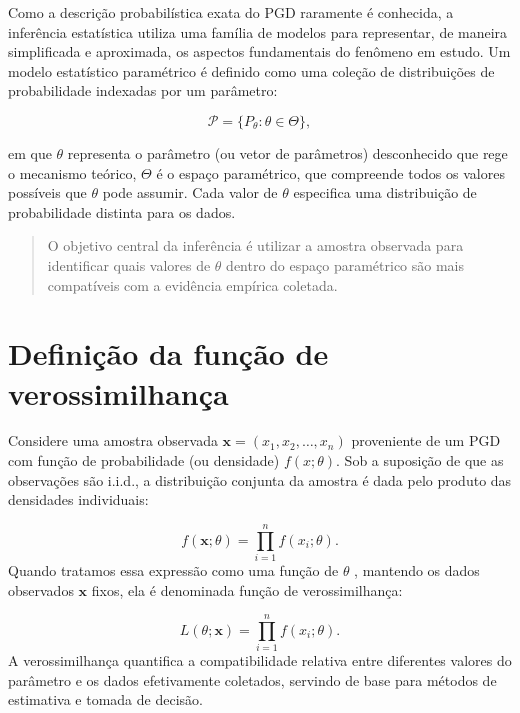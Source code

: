 \documentclass[
  letterpaper,
  DIV=11,
  numbers=noendperiod]{scrreprt}
\begin{document}
Como a descrição probabilística exata do PGD raramente é conhecida, a
inferência estatística utiliza uma família de modelos para representar,
de maneira simplificada e aproximada, os aspectos fundamentais do
fenômeno em estudo. Um modelo estatístico paramétrico é definido como
uma coleção de distribuições de probabilidade indexadas por um
parâmetro:

\[\mathcal{P} = \{P_{\theta}: \theta \in \Theta\},\]

em que \(\theta\) representa o parâmetro (ou vetor de parâmetros)
desconhecido que rege o mecanismo teórico, \(\Theta\) é o espaço
paramétrico, que compreende todos os valores possíveis que \(\theta\)
pode assumir. Cada valor de \(\theta\) especifica uma distribuição de
probabilidade distinta para os dados.

\begin{quote}
O objetivo central da inferência é utilizar a amostra observada para
identificar quais valores de \(\theta\) dentro do espaço paramétrico são
mais compatíveis com a evidência empírica coletada.
\end{quote}

\section{Definição da função de
verossimilhança}\label{definiuxe7uxe3o-da-funuxe7uxe3o-de-verossimilhanuxe7a}

Considere uma amostra observada \(\mathbf{x}=(x_1,x_2,\ldots,x_n)\)
proveniente de um PGD com função de probabilidade (ou densidade)
\(f(x;\theta)\). Sob a suposição de que as observações são i.i.d., a
distribuição conjunta da amostra é dada pelo produto das densidades
individuais:

\[f(\mathbf{x}; \theta) = \prod\limits_{i=1}^{n}f(x_i;\theta).\] Quando
tratamos essa expressão como uma função de \(\theta\) , mantendo os
dados observados \(\mathbf{x}\) fixos, ela é denominada função de
verossimilhança:

\[L(\theta; \mathbf{x}) = \prod\limits_{i=1}^{n}f(x_i;\theta).\] A
verossimilhança quantifica a compatibilidade relativa entre diferentes
valores do parâmetro e os dados efetivamente coletados, servindo de base
para métodos de estimativa e tomada de decisão.
\end{document}
